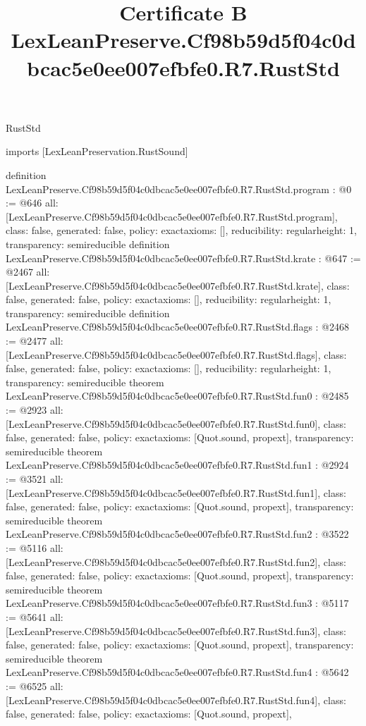 \begin{lexlean}{RustStd}
\title{Certificate B LexLeanPreserve.Cf98b59d5f04c0dbcac5e0ee007efbfe0.R7.RustStd}
\begin{coremodule}
imports [LexLeanPreservation.RustSound]

definition LexLeanPreserve.Cf98b59d5f04c0dbcac5e0ee007efbfe0.R7.RustStd.program : @0 := @646 {
  all: [LexLeanPreserve.Cf98b59d5f04c0dbcac5e0ee007efbfe0.R7.RustStd.program],
  class: false,
  generated: false,
  policy: exact{axioms: []},
  reducibility: regular{height: 1},
  transparency: semireducible
}
definition LexLeanPreserve.Cf98b59d5f04c0dbcac5e0ee007efbfe0.R7.RustStd.krate : @647 := @2467 {
  all: [LexLeanPreserve.Cf98b59d5f04c0dbcac5e0ee007efbfe0.R7.RustStd.krate],
  class: false,
  generated: false,
  policy: exact{axioms: []},
  reducibility: regular{height: 1},
  transparency: semireducible
}
definition LexLeanPreserve.Cf98b59d5f04c0dbcac5e0ee007efbfe0.R7.RustStd.flags : @2468 := @2477 {
  all: [LexLeanPreserve.Cf98b59d5f04c0dbcac5e0ee007efbfe0.R7.RustStd.flags],
  class: false,
  generated: false,
  policy: exact{axioms: []},
  reducibility: regular{height: 1},
  transparency: semireducible
}
theorem LexLeanPreserve.Cf98b59d5f04c0dbcac5e0ee007efbfe0.R7.RustStd.fun0 : @2485 := @2923 {
  all: [LexLeanPreserve.Cf98b59d5f04c0dbcac5e0ee007efbfe0.R7.RustStd.fun0],
  class: false,
  generated: false,
  policy: exact{axioms: [Quot.sound, propext]},
  transparency: semireducible
}
theorem LexLeanPreserve.Cf98b59d5f04c0dbcac5e0ee007efbfe0.R7.RustStd.fun1 : @2924 := @3521 {
  all: [LexLeanPreserve.Cf98b59d5f04c0dbcac5e0ee007efbfe0.R7.RustStd.fun1],
  class: false,
  generated: false,
  policy: exact{axioms: [Quot.sound, propext]},
  transparency: semireducible
}
theorem LexLeanPreserve.Cf98b59d5f04c0dbcac5e0ee007efbfe0.R7.RustStd.fun2 : @3522 := @5116 {
  all: [LexLeanPreserve.Cf98b59d5f04c0dbcac5e0ee007efbfe0.R7.RustStd.fun2],
  class: false,
  generated: false,
  policy: exact{axioms: [Quot.sound, propext]},
  transparency: semireducible
}
theorem LexLeanPreserve.Cf98b59d5f04c0dbcac5e0ee007efbfe0.R7.RustStd.fun3 : @5117 := @5641 {
  all: [LexLeanPreserve.Cf98b59d5f04c0dbcac5e0ee007efbfe0.R7.RustStd.fun3],
  class: false,
  generated: false,
  policy: exact{axioms: [Quot.sound, propext]},
  transparency: semireducible
}
theorem LexLeanPreserve.Cf98b59d5f04c0dbcac5e0ee007efbfe0.R7.RustStd.fun4 : @5642 := @6525 {
  all: [LexLeanPreserve.Cf98b59d5f04c0dbcac5e0ee007efbfe0.R7.RustStd.fun4],
  class: false,
  generated: false,
  policy: exact{axioms: [Quot.sound, propext]},
}
\end{coremodule}
\end{lexlean}
